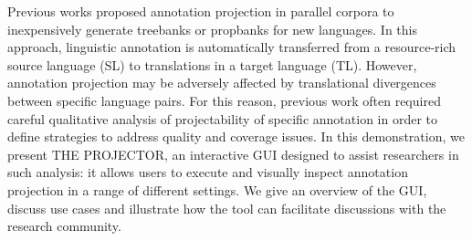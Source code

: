 Previous works proposed annotation projection in parallel corpora to inexpensively generate treebanks or propbanks for new languages. In this approach, linguistic annotation is automatically transferred from a resource-rich source language (SL) to translations in a target language (TL). However, annotation projection may be adversely affected by translational divergences between specific language pairs. For this reason, previous work often required careful qualitative analysis of projectability of specific annotation in order to define strategies to address quality and coverage issues. In this demonstration, we present THE PROJECTOR, an interactive GUI designed to assist researchers in such analysis: it allows users to execute and visually inspect annotation projection in a range of different settings. We give an overview of the GUI, discuss use cases and illustrate how the tool can facilitate discussions with the research community.
